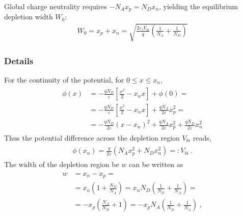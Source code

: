 \documentclass[letterpaper,10pt,english]{jupyterBook}
\begin{document}
\sphinxAtStartPar
Global charge neutrality requires \(-N_A x_p = N_D x_n\), yielding the equilibrium depletion width \(W_0\):
\begin{equation*}
\begin{split}W_0 = x_p + x_n = \sqrt{\frac{2\varepsilon_s V_{bi}}{q} \left( \frac{1}{N_A} + \frac{1}{N_D} \right)}\end{split}
\end{equation*}\subsubsection*{Details}

\sphinxAtStartPar
For the continuity of the potential, for \(0 \le x \le x_n\),
\begin{equation*}
\begin{split}\begin{aligned}
  \phi(x) 
  & = - \frac{q N_D}{\varepsilon} \left[ \frac{x^2}{2} - x_n x \right] + \phi(0) = \\
  & = - \frac{q N_D}{\varepsilon} \left[ \frac{x^2}{2} - x_n x \right] + \frac{q N_A}{2 \varepsilon} x_p^2 = \\
  & = - \frac{q N_D}{2 \varepsilon} \left( x - x_n  \right)^2 + \frac{q N_A}{2 \varepsilon} x_p^2 + \frac{q N_D}{2 \varepsilon} x_n^2
\end{aligned}\end{split}
\end{equation*}
\sphinxAtStartPar
Thus the potential difference across the depletion region \(V_{bi}\) reads,
\begin{equation*}
\begin{split}\begin{aligned}
  \phi(x_n) = \frac{q}{2 \varepsilon} \left( N_A x_p^2 + N_D x_n^2 \right) =: V_{bi} \ .
\end{aligned}\end{split}
\end{equation*}
\sphinxAtStartPar
The width of the depletion region be \(w\) can be written as
\begin{equation*}
\begin{split}\begin{aligned}
  w 
  & = x_n - x_p = \\ 
  & = x_n \left( 1 + \frac{N_D}{N_A} \right)
    = x_n N_D \left( \frac{1}{N_D} + \frac{1}{N_A} \right) = \\
  & = - x_p \left( \frac{N_A}{N_D} + 1 \right) 
    = - x_p N_A \left( \frac{1}{N_D} + \frac{1}{N_A} \right) \ ,
\end{aligned}\end{split}
\end{equation*}
\end{document}
